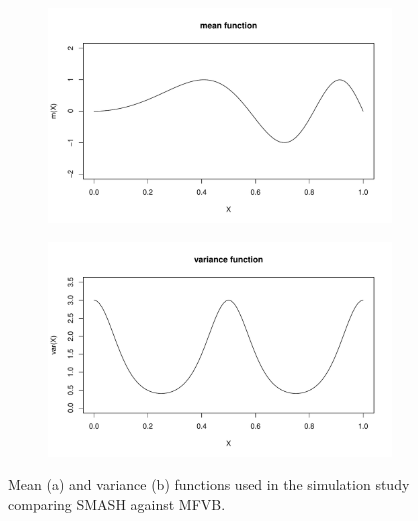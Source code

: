 \documentclass[12pt]{article}
\begin{document}
\begin{figure}[ht]
\centering
    \begin{subfigure}[b]{0.45\textwidth}
        \centering
        \includegraphics[width=\textwidth]{mfvb_mean.pdf}
        \caption{}
        \label{fig:seq_peak_data}
    \end{subfigure}
    \hfill
    \begin{subfigure}[b]{0.45\textwidth}
        \centering
        \includegraphics[width=\textwidth]{mfvb_var.pdf}
        \caption{}
        \label{fig:seq_peak_est}
    \end{subfigure}
    \caption{Mean (a) and variance (b) functions used in the simulation study comparing SMASH against MFVB.}
    \label{fig:mfvb_fn}
\end{figure}
\end{document}
